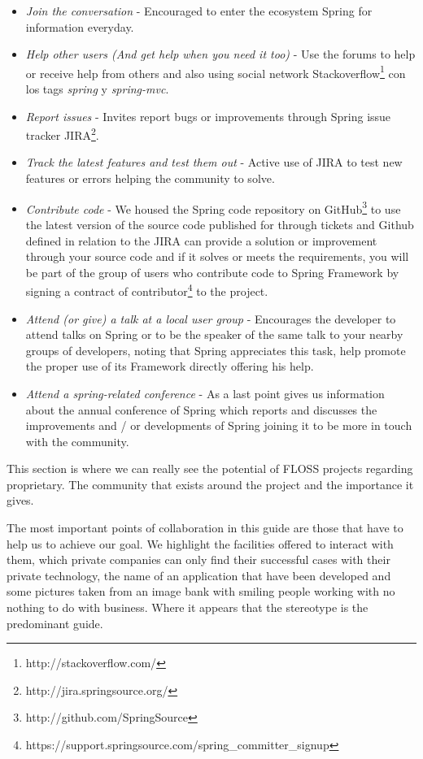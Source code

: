 \documentclass[11pt]{scrartcl}
\begin{document}
\begin{itemize}
    \item \emph{Join the conversation} - Encouraged to enter the ecosystem Spring for information everyday.
    \item \emph{Help other users (And get help when you need it too)} - Use the forums to help or receive help from others and also using social network Stackoverflow\footnote{http://stackoverflow.com/} con los tags \emph{spring} y \emph{spring-mvc}.
    \item \emph{Report issues} - Invites report bugs or improvements through Spring issue tracker JIRA\footnote{http://jira.springsource.org/}.
    \item \emph{Track the latest features and test them out} - Active use of JIRA to test new features or errors helping the community to solve.
    \item \emph{Contribute code} - We housed the Spring code repository on GitHub\footnote{http://github.com/SpringSource} to use the latest version of the source code published for through tickets and Github defined in relation to the JIRA can provide a solution or improvement through your source code and if it solves or meets the requirements, you will be part of the group of users who contribute code to Spring Framework by signing a contract of contributor\footnote{https://support.springsource.com/spring\_committer\_signup} to the project.
    \item \emph{Attend (or give) a talk at a local user group} - Encourages the developer to attend talks on Spring or to be the speaker of the same talk to your nearby groups of developers, noting that Spring appreciates this task, help promote the proper use of its Framework directly offering his help.
    \item \emph{Attend a spring-related conference} - As a last point gives us information about the annual conference of Spring which reports and discusses the improvements and / or developments of Spring joining it to be more in touch with the community.
\end{itemize}

\par This section is where we can really see the potential of FLOSS projects regarding proprietary. The community that exists around the project and the importance it gives.

\par The most important points of collaboration in this guide are those that have to help us to achieve our goal. We highlight the facilities offered to interact with them, which private companies can only find their successful cases with their private technology, the name of an application that have been developed and some pictures taken from an image bank with smiling people working with no nothing to do with business. Where it appears that the stereotype is the predominant guide.
\end{document}
